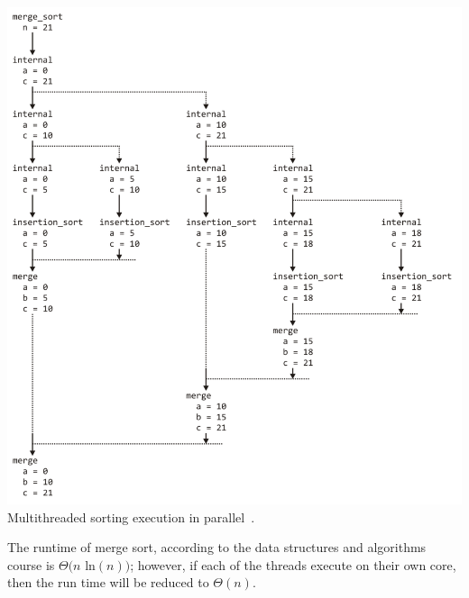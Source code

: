 \begin{center}
	\includegraphics[width=\textwidth]{images/merge-sort-execution.png}\\
	Multithreaded sorting execution in parallel~\cite{mte241}.
\end{center}

The runtime of merge sort, according to the data structures and algorithms course is $\Theta(n$ ln$(n))$; however, if each of the threads execute on their own core, then the run time will be reduced to $\Theta(n)$.




